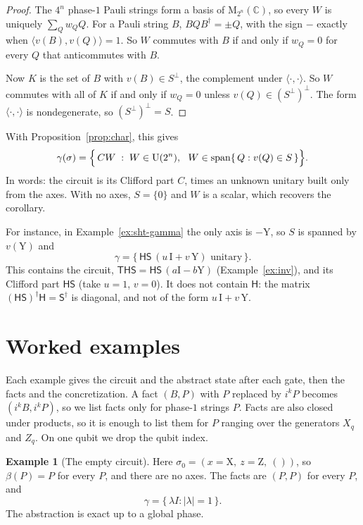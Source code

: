 \documentclass[11pt]{article}
\theoremstyle{definition}
\newtheorem{example}[theorem]{Example}
\theoremstyle{remark}
\newcommand{\C}{\mathbb{C}}
\newcommand{\Mat}{\mathrm{M}_{2^n}(\C)}
\newcommand{\Unit}{\mathrm{U}(2^n)}
\newcommand{\adj}{^{\dagger}}
\newcommand{\gam}{\gamma}
\newcommand{\back}{\beta}
\newcommand{\tI}{\mathrm{I}}
\newcommand{\tX}{\mathrm{X}}
\newcommand{\tY}{\mathrm{Y}}
\newcommand{\tZ}{\mathrm{Z}}
\newcommand{\gate}[1]{\mathsf{#1}}
\begin{document}
\begin{proof}
The $4^n$ phase-$1$ Pauli strings form a basis of $\Mat$, so every $W$ is uniquely
$\sum_Q w_Q Q$. For a Pauli string $B$, $B Q B\adj = \pm Q$, with the sign $-$ exactly
when $\langle v(B), v(Q)\rangle = 1$. So $W$ commutes with $B$ if and only if $w_Q = 0$ for
every $Q$ that anticommutes with $B$.

Now $K$ is the set of $B$ with $v(B) \in S^\perp$, the complement under
$\langle\cdot,\cdot\rangle$. So $W$ commutes with all of $K$ if and only if $w_Q = 0$
unless $v(Q) \in (S^\perp)^\perp$. The form $\langle\cdot,\cdot\rangle$ is
nondegenerate, so $(S^\perp)^\perp = S$.
\end{proof}

With Proposition~\ref{prop:char}, this gives
\begin{equation}\label{eq:gamma-explicit}
  \gam(\sigma) = \Bigl\{\, C W \;:\; W \in \Unit,\ \ W \in \mathrm{span}\{\, Q : v(Q) \in S \,\} \Bigr\}.
\end{equation}
In words: the circuit is its Clifford part $C$, times an unknown unitary built only from
the axes. With no axes, $S = \{0\}$ and $W$ is a scalar, which recovers the corollary.

For instance, in Example~\ref{ex:sht-gamma} the only axis is $-\tY$, so $S$ is spanned by
$v(\tY)$ and
\[
  \gam = \{\, \gate H\gate S\,(u\,\tI + v\,\tY) \text{ unitary} \,\}.
\]
This contains the circuit, $\gate T\gate H\gate S = \gate H\gate S\,(a\tI - b\tY)$
(Example~\ref{ex:inv}), and its Clifford part $\gate H\gate S$ (take $u = 1$, $v = 0$). It
does not contain $\gate H$: the matrix $(\gate H\gate S)\adj \gate H = \gate S\adj$ is
diagonal, and not of the form $u\,\tI + v\,\tY$.

\section{Worked examples}\label{sec:examples}

Each example gives the circuit and the abstract state after each gate, then the facts and
the concretization. A fact $(B, P)$ with $P$ replaced by $i^k P$ becomes $(i^k B, i^k P)$,
so we list facts only for phase-$1$ strings $P$. Facts are also closed under products, so
it is enough to list them for $P$ ranging over the generators $X_q$ and $Z_q$. On one
qubit we drop the qubit index.

\begin{example}[The empty circuit]
Here $\sigma_0 = (x = \tX,\ z = \tZ,\ ())$, so $\back(P) = P$ for every $P$, and there are no
axes. The facts are $(P, P)$ for every $P$, and
\[
  \gam = \{\, \lambda I : |\lambda| = 1 \,\}.
\]
The abstraction is exact up to a global phase.
\end{example}
\end{document}
